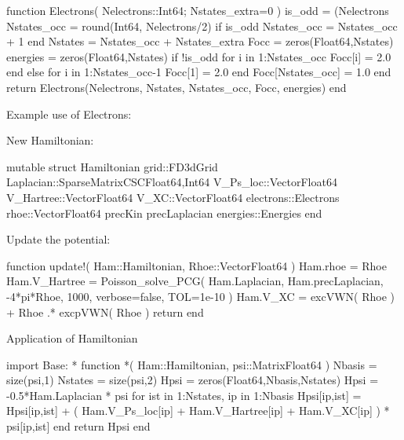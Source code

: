 \begin{juliacode}
function Electrons( Nelectrons::Int64; Nstates_extra=0 )
  is_odd = (Nelectrons%
  Nstates_occ = round(Int64, Nelectrons/2)
  if is_odd
      Nstates_occ = Nstates_occ + 1
  end
  Nstates = Nstates_occ + Nstates_extra
  Focc = zeros(Float64,Nstates)
  energies = zeros(Float64,Nstates)
  if !is_odd
    for i in 1:Nstates_occ
      Focc[i] = 2.0 
    end
  else
    for i in 1:Nstates_occ-1
      Focc[1] = 2.0
    end
    Focc[Nstates_occ] = 1.0
  end
  return Electrons(Nelectrons, Nstates, Nstates_occ, Focc, energies)
end
\end{juliacode}

Example use of Electrons:

New Hamiltonian:
\begin{juliacode}
mutable struct Hamiltonian
  grid::FD3dGrid
  Laplacian::SparseMatrixCSC{Float64,Int64}
  V_Ps_loc::Vector{Float64}
  V_Hartree::Vector{Float64}
  V_XC::Vector{Float64}
  electrons::Electrons
  rhoe::Vector{Float64}
  precKin
  precLaplacian
  energies::Energies
end
\end{juliacode}


Update the potential:

\begin{juliacode}
function update!( Ham::Hamiltonian, Rhoe::Vector{Float64} )
  Ham.rhoe = Rhoe
  Ham.V_Hartree = Poisson_solve_PCG( Ham.Laplacian, Ham.precLaplacian,
    -4*pi*Rhoe, 1000, verbose=false, TOL=1e-10 )
  Ham.V_XC = excVWN( Rhoe ) + Rhoe .* excpVWN( Rhoe )
  return
end
\end{juliacode}

Application of Hamiltonian

\begin{juliacode}
import Base: *
function *( Ham::Hamiltonian, psi::Matrix{Float64} )
  Nbasis = size(psi,1)
  Nstates = size(psi,2)
  Hpsi = zeros(Float64,Nbasis,Nstates)
  Hpsi = -0.5*Ham.Laplacian * psi
  for ist in 1:Nstates, ip in 1:Nbasis
    Hpsi[ip,ist] = Hpsi[ip,ist] + ( Ham.V_Ps_loc[ip] + Ham.V_Hartree[ip] +
                   Ham.V_XC[ip] ) * psi[ip,ist]
  end
  return Hpsi
end
\end{juliacode}